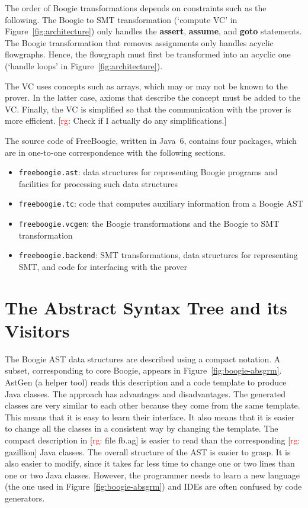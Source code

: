 \documentclass{llncs}
\newcommand{\rg}[1]{{\small [\textcolor{red}{rg}: #1]}}
\begin{document}
The order of Boogie transformations depends on constraints
such as the following. The Boogie to SMT transformation
(`compute VC' in Figure~\ref{fig:architecture}) only handles
the \textbf{assert}, \textbf{assume}, and \textbf{goto}
statements. The Boogie transformation that removes assignments
only handles acyclic flowgraphs. Hence, the flowgraph must
first be transformed into an acyclic one (`handle loops' in
Figure~\ref{fig:architecture}).

The VC uses concepts such as arrays, which may or may not be
known to the prover. In the latter case, axioms that describe
the concept must be added to the VC\null. Finally, the VC is
simplified so that the communication with the prover is
more efficient. \rg{Check if I actually do any simplifications.}

The source code of FreeBoogie, written in Java~6, contains
four packages, which are in one-to-one correspondence with the
following sections.

\begin{itemize}
\item \texttt{freeboogie.ast}: data structures for representing
  Boogie programs and facilities for processing such data structures
\item \texttt{freeboogie.tc}: code that computes auxiliary information
  from a Boogie AST
\item \texttt{freeboogie.vcgen}: the Boogie transformations and
  the Boogie to SMT transformation
\item \texttt{freeboogie.backend}: 
  SMT transformations, 
  data structures for representing SMT, 
  and code for interfacing with the prover
\end{itemize}

\section{The Abstract Syntax Tree and its Visitors} %
\label{sec:design.ast}

The Boogie AST data structures are described using a compact notation. A
subset, corresponding to core Boogie, appears in
Figure~\ref{fig:boogie-absgrm}. AstGen (a helper tool) reads this
description and a code template to produce Java classes. The approach has
advantages and disadvantages. The generated classes are very similar to
each other because they come from the same template. This means that it is
easy to learn their interface.  It also means that it is easier to change
all the classes in a consistent way by changing the template. The compact
description in \rg{file fb.ag} is easier to read than the corresponding
\rg{gazillion} Java classes. The overall structure of the AST is easier to
grasp. It is also easier to modify, since it takes far less time to change
one or two lines than one or two Java classes. However, the programmer
needs to learn a new language (the one used in
Figure~\ref{fig:boogie-absgrm}) and IDEs are often confused by code
generators.
\end{document}
